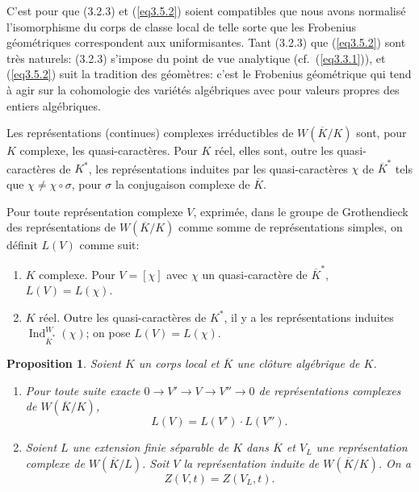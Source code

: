 \documentclass[11pt,a4paper]{amsart}
\theoremstyle{plain}
\newtheorem{proposition}[theorem]{Proposition}
\theoremstyle{definition}
\DeclareMathOperator{\Ind}{Ind}
\newenvironment{para}{\par\noindent}{\par}
\newcommand{\ov}[1]{\overline{#1}}
\begin{document}
\begin{para}\label{para3.6}
C'est pour que (3.2.3) et (\ref{eq3.5.2}) soient compatibles que nous avons normalis\'e l'isomorphisme du corps de classe local de telle sorte que les Frobenius g\'eom\'etriques correspondent aux uniformisantes. Tant (3.2.3) que (\ref{eq3.5.2}) sont tr\`es naturels: (3.2.3) s'impose du point de vue analytique (cf.~(\ref{eq3.3.1})), et (\ref{eq3.5.2}) suit la tradition des g\'eom\`etres: c'est le Frobenius g\'eom\'etrique qui tend \`a agir sur la cohomologie des vari\'et\'es alg\'ebriques avec pour valeurs propres des entiers alg\'ebriques.
\end{para}

\begin{para}
Les repr\'esentations (continues) complexes irr\'eductibles de $W(\ov{K}/K)$ sont, pour $K$ complexe, les quasi-caract\`eres. Pour $K$ r\'eel, elles sont, outre les quasi-caract\`eres de $K^{*}$, les repr\'esentations induites par les quasi-caract\`eres $\chi$ de $\ov{K}^{*}$ tels que $\chi \not= \chi \circ \sigma$, pour $\sigma$ la conjugaison complexe de $\ov{K}$.
\end{para}

\begin{para}
Pour toute repr\'esentation complexe $V$, exprim\'ee, dans le groupe de Grothendieck des repr\'esentations de $W(\ov{K}/K)$ comme somme de repr\'esentations simples, on d\'efinit $L(V)$ comme suit:
\begin{enumerate}
\item[$1)$] $K$ complexe. Pour $V = [\chi]$ avec $\chi$ un quasi-caract\`ere de $\ov{K}^{*}$, $L(V) = L(\chi)$.
\item[$2)$] $K$ r\'eel. Outre les quasi-caract\`eres de $K^{*}$, il y a les repr\'esentations induites $\Ind_{\ov{K}^{*}}^{W}(\chi)$; on pose $L(V) = L(\chi)$.
\end{enumerate}
\end{para}

\begin{proposition}\label{prop3.8}
Soient $K$ un corps local et $\ov{K}$ une cl\^oture alg\'ebrique de $K$.
\begin{enumerate}
\item[\rm(i)] Pour toute suite exacte $0 \to V' \to V \to V'' \to 0$ de repr\'esentations complexes de $W(\ov{K}/K)$,
\begin{equation}\label{eq3.8.1}
L(V) = L(V') \cdot L(V'').
\end{equation}
\item[\rm(ii)] Soient $L$ une extension finie s\'eparable de $K$ dans $\ov{K}$ et $V_{L}$ une repr\'esentation complexe de $W(\ov{K}/L)$. Soit $V$ la repr\'esentation induite de $W(\ov{K}/K)$. On a
\begin{equation}\label{eq3.8.2}
Z(V,t) = Z(V_{L},t).
\end{equation}
\end{enumerate}
\end{proposition}
\end{document}

